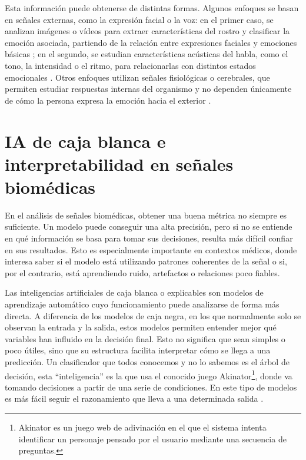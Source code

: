 Esta información puede obtenerse de distintas formas. Algunos enfoques se basan en señales externas, como la expresión facial o la voz: en el primer caso, se analizan imágenes o vídeos para extraer características del rostro y clasificar la emoción asociada, partiendo de la relación entre expresiones faciales y emociones básicas \cite{ekman1971constants,pantic2000automatic}; en el segundo, se estudian características acústicas del habla, como el tono, la intensidad o el ritmo, para relacionarlas con distintos estados emocionales \cite{martindiego2006emociones}. Otros enfoques utilizan señales fisiológicas o cerebrales, que permiten estudiar respuestas internas del organismo y no dependen únicamente de cómo la persona expresa la emoción hacia el exterior \cite{shu2018physiological,alarcao2019eeg}.


\section{IA de caja blanca e interpretabilidad en señales biomédicas}
En el análisis de señales biomédicas, obtener una buena métrica no siempre es suficiente. Un modelo puede conseguir una alta precisión, pero si no se entiende en qué información se basa para tomar sus decisiones, resulta más difícil confiar en sus resultados. Esto es especialmente importante en contextos médicos, donde interesa saber si el modelo está utilizando patrones coherentes de la señal o si, por el contrario, está aprendiendo ruido, artefactos o relaciones poco fiables.

Las inteligencias artificiales de caja blanca o explicables son modelos de aprendizaje automático cuyo funcionamiento puede analizarse de forma más directa. A diferencia de los modelos de caja negra, en los que normalmente solo se observan la entrada y la salida, estos modelos permiten entender mejor qué variables han influido en la decisión final. Esto no significa que sean simples o poco útiles, sino que su estructura facilita interpretar cómo se llega a una predicción. Un clasificador que todos conocemos y no lo sabemos es el árbol de decisión, esta ``inteligencia'' es la que usa el conocido juego Akinator\footnote{Akinator es un juego web de adivinación en el que el sistema intenta identificar un personaje pensado por el usuario mediante una secuencia de preguntas.}, donde va tomando decisiones a partir de una serie de condiciones. En este tipo de modelos es más fácil seguir el razonamiento que lleva a una determinada salida \cite{molnar2022interpretable}.


